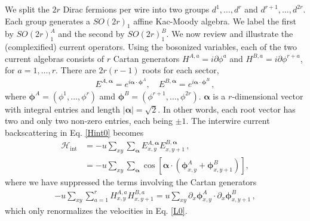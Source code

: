 We split the $2r$ Dirac fermions per wire into two groups $d^1,\ldots,d^r$ and $d^{r+1},\ldots,d^{2r}$. Each group generates a $SO(2r)_1$ affine Kac-Moody algebra. We label the first by $SO(2r)_1^A$ and the second by $SO(2r)_1^B$. We now review and illustrate the (complexified) current operators. Using the bosonized variables, each of the two current algebras consists of $r$ Cartan generators $H^{A,a}=i\partial\phi^a$ and $H^{B,a}=i\partial\phi^{r+a}$, for $a=1,\ldots,r$. There are $2r(r-1)$ roots for each sector, \begin{align}E^{A,\boldsymbol\alpha}=e^{i\boldsymbol\alpha\cdot\boldsymbol\phi^A},\quad E^{B,\boldsymbol\alpha}=e^{i\boldsymbol\alpha\cdot\boldsymbol\phi^B} \,, \end{align} where $\boldsymbol\phi^A=(\phi^1,\ldots,\phi^r)$ amd $\boldsymbol\phi^B=(\phi^{r+1},\ldots,\phi^{2r})$. $\boldsymbol\alpha$ is a $r$-dimensional vector with integral entries and length $|\boldsymbol\alpha|=\sqrt{2}$. In other words, each root vector has two and only two non-zero entries, each being $\pm1$. The interwire current backscattering in Eq. \eqref{Hint0} becomes \begin{align}\mathcal{H}_{\mathrm{int}}&=-u\sum_{xy}\sum_{\boldsymbol\alpha}E^{A,\boldsymbol\alpha}_{x,y}E^{B,\boldsymbol\alpha}_{x,y+1}\nonumber \,, \\&=-u\sum_{xy}\sum_{\boldsymbol\alpha}\cos\left[\boldsymbol\alpha\cdot(\boldsymbol\phi^A_{x,y}+\boldsymbol\phi^B_{x,y+1})\right],\label{Hinteven}\end{align} where we have suppressed the terms involving the Cartan generators \begin{align}-u\sum_{xy}\sum_{a=1}^rH^{A,a}_{x,y}H^{B,a}_{x,y+1}=u\sum_{xy}\partial_x\boldsymbol\phi^A_{x,y}\cdot\partial_x\boldsymbol\phi^B_{x,y+1} \,, \label{evenforwardscattering}\end{align} which only renormalizes the velocities in Eq. \eqref{L0}.


